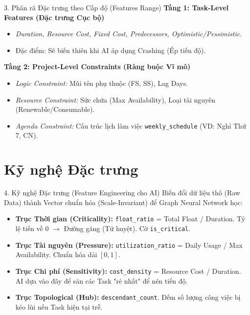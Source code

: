 \documentclass[aspectratio=169]{beamer}
\begin{document}
\begin{frame}{3. Phân rã Đặc trưng theo Cấp độ (Features Range)}
    \textbf{Tầng 1: Task-Level Features (Đặc trưng Cục bộ)}
    \begin{itemize}
        \item \textit{Duration, Resource Cost, Fixed Cost, Predecessors, Optimistic/Pessimistic.}
        \item Đặc điểm: Sẽ biến thiên khi AI áp dụng Crashing (Ép tiến độ).
    \end{itemize}
    \vspace{0.2cm}
    \textbf{Tầng 2: Project-Level Constraints (Ràng buộc Vĩ mô)}
    \begin{itemize}
        \item \textit{Logic Constraint:} Mũi tên phụ thuộc (FS, SS), Lag Days.
        \item \textit{Resource Constraint:} Sức chứa (Max Availability), Loại tài nguyên (Renewable/Consumable).
        \item \textit{Agenda Constraint:} Cấu trúc lịch làm việc \texttt{weekly\_schedule} (VD: Nghỉ Thứ 7, CN).
    \end{itemize}
\end{frame}

\section{Kỹ nghệ Đặc trưng}

\begin{frame}{4. Kỹ nghệ Đặc trưng (Feature Engineering cho AI)}
    Biến đổi dữ liệu thô (Raw Data) thành Vector chuẩn hóa (Scale-Invariant) để Graph Neural Network học:
    \vspace{0.3cm}
    \begin{itemize}
        \item \textbf{Trục Thời gian (Criticality):} \texttt{float\_ratio} = Total Float / Duration. Tỷ lệ tiến về 0 $\rightarrow$ Đường găng (Tử huyệt). Cờ \texttt{is\_critical}.
        \item \textbf{Trục Tài nguyên (Pressure):} \texttt{utilization\_ratio} = Daily Usage / Max Availability. Chuẩn hóa dải $[0, 1]$.
        \item \textbf{Trục Chi phí (Sensitivity):} \texttt{cost\_density} = Resource Cost / Duration. AI dựa vào đây để săn các Task "rẻ nhất" để nén tiến độ.
        \item \textbf{Trục Topological (Hub):} \texttt{descendant\_count}. Đếm số lượng công việc bị kéo lùi nếu Task hiện tại trễ.
    \end{itemize}
\end{frame}
\end{document}
